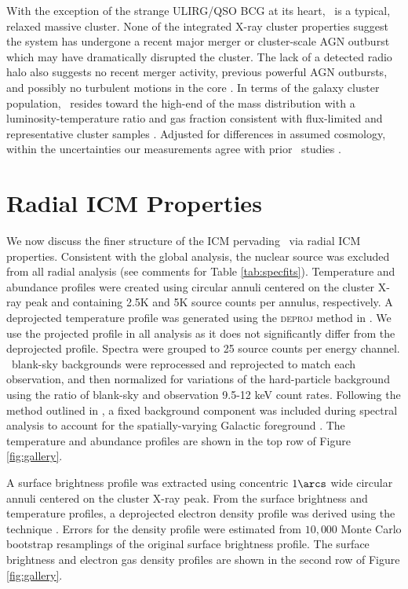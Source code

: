 \documentclass[useAMS,usenatbib]{mn2e}
\begin{document}
With the exception of the strange ULIRG/QSO BCG at its heart, \rxj\ is
a typical, relaxed massive cluster. None of the integrated X-ray
cluster properties suggest the system has undergone a recent major
merger or cluster-scale AGN outburst which may have dramatically
disrupted the cluster. The lack of a detected radio halo also suggests
no recent merger activity, previous powerful AGN outbursts, and
possibly no turbulent motions in the core
\citep{2008SSRv..134...93F}. In terms of the galaxy cluster
population, \rxj\ resides toward the high-end of the mass distribution
with a luminosity-temperature ratio and gas fraction consistent with
flux-limited and representative cluster samples \citep{hiflugcs2,
  2009A&A...498..361P}. Adjusted for differences in assumed cosmology,
within the uncertainties our measurements agree with prior
\irs\ studies \citep[\eg][]{2000MNRAS.315..269A}.

\section{Radial ICM Properties}
\label{sec:rad}

We now discuss the finer structure of the ICM pervading \rxj\ via
radial ICM properties. Consistent with the global analysis, the
nuclear source was excluded from all radial analysis (see comments for
Table \ref{tab:specfits}). Temperature and abundance profiles were
created using circular annuli centered on the cluster X-ray peak and
containing 2.5K and 5K source counts per annulus, respectively. A
deprojected temperature profile was generated using the
\textsc{deproj} method in \xspec. We use the projected profile in all
analysis as it does not significantly differ from the deprojected
profile. Spectra were grouped to 25 source counts per energy
channel. \caldb\ blank-sky backgrounds were reprocessed and
reprojected to match each observation, and then normalized for
variations of the hard-particle background using the ratio of
blank-sky and observation 9.5-12 keV count rates. Following the method
outlined in \citet{2005ApJ...628..655V}, a fixed background component
was included during spectral analysis to account for the
spatially-varying Galactic foreground \citep[see][for more
  detail]{xrayband}. The temperature and abundance profiles are shown
in the top row of Figure \ref{fig:gallery}.

A surface brightness profile was extracted using concentric $1\arcs$
wide circular annuli centered on the cluster X-ray peak. From the
surface brightness and temperature profiles, a deprojected electron
density profile was derived using the \citet{kriss83} technique
\citep[see][for more detail]{accept}. Errors for the density profile
were estimated from $10,000$ Monte Carlo bootstrap resamplings of the
original surface brightness profile. The surface brightness and
electron gas density profiles are shown in the second row of Figure
\ref{fig:gallery}.
\end{document}
